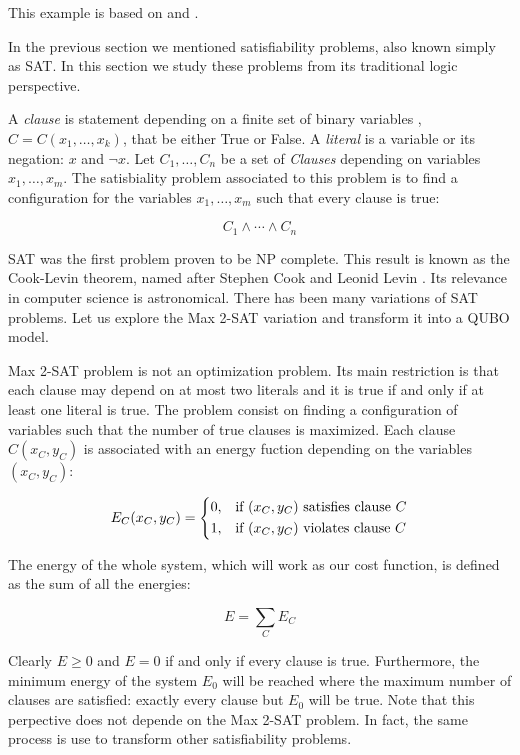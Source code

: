 This example is based on \cite{Glover2019} and \cite{Farhi2000}.

In the previous section we mentioned satisfiability problems, also known simply as SAT. In this section we study these problems from its traditional logic perspective.

A \emph{clause} is statement depending on a finite set of binary variables , $C = C(x_1, \ldots, x_k)$, that be either True or False. A \emph{literal} is a variable or its negation: $x$ and $\neg x$. Let $C_1, \ldots, C_n$ be a set of \emph{Clauses} depending on variables $x_1, \ldots, x_m$. The satisbiality problem associated to this problem is to find a configuration for the variables $x_1, \ldots, x_m$ such that every clause is true:

$$ C_1 \wedge \cdots \wedge C_n $$

SAT was the first problem proven to be NP complete. This result is known as the Cook-Levin theorem, named after Stephen Cook and Leonid Levin \cite{Book1980}. Its relevance in computer science is astronomical. There has been many variations of SAT problems. Let us explore the Max 2-SAT variation and transform it into a QUBO model.

Max 2-SAT problem is not an optimization problem. Its main restriction is that each clause may depend on at most two literals and it is true if and only if at least one literal is true. The problem consist on finding a configuration of variables such that the number of true clauses is maximized. Each clause $C(x_C, y_C)$ is associated with an energy fuction depending on the variables $(x_C, y_C)$:

\begin{equation*}
E_C(x_C, y_C) = 
\begin{dcases}
0,	& \text{if } (x_C, y_C) \text{ satisfies clause } C \\
1,	& \text{if } (x_C, y_C) \text{ violates clause } C \\
\end{dcases}
\end{equation*}

The energy of the whole system, which will work as our cost function, is defined as the sum of all the energies:

$$E = \sum_C E_C$$

Clearly $E \geq 0$ and $E = 0$ if and only if every clause is true. Furthermore, the minimum energy of the system $E_0$ will be reached where the maximum number of clauses are satisfied: exactly every clause but $E_0$ will be true. Note that this perpective does not depende on the Max 2-SAT problem. In fact, the same process is use to transform other satisfiability problems.

